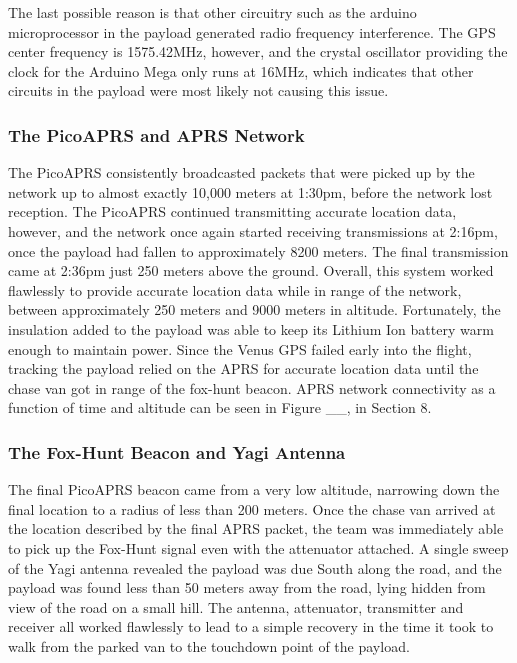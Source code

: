\documentclass[12pt,]{article}
\begin{document}
The last possible reason is that other circuitry such as the arduino
microprocessor in the payload generated radio frequency interference.
The GPS center frequency is 1575.42MHz, however, and the crystal
oscillator providing the clock for the Arduino Mega only runs at 16MHz,
which indicates that other circuits in the payload were most likely not
causing this issue.

\subsubsection{The PicoAPRS and APRS
Network}\label{the-picoaprs-and-aprs-network}

The PicoAPRS consistently broadcasted packets that were picked up by the
network up to almost exactly 10,000 meters at 1:30pm, before the network
lost reception. The PicoAPRS continued transmitting accurate location
data, however, and the network once again started receiving
transmissions at 2:16pm, once the payload had fallen to approximately
8200 meters. The final transmission came at 2:36pm just 250 meters above
the ground. Overall, this system worked flawlessly to provide accurate
location data while in range of the network, between approximately 250
meters and 9000 meters in altitude. Fortunately, the insulation added to
the payload was able to keep its Lithium Ion battery warm enough to
maintain power. Since the Venus GPS failed early into the flight,
tracking the payload relied on the APRS for accurate location data until
the chase van got in range of the fox-hunt beacon. APRS network
connectivity as a function of time and altitude can be seen in Figure
\_\_, in Section 8.

\subsubsection{The Fox-Hunt Beacon and Yagi
Antenna}\label{the-fox-hunt-beacon-and-yagi-antenna}

The final PicoAPRS beacon came from a very low altitude, narrowing down
the final location to a radius of less than 200 meters. Once the chase
van arrived at the location described by the final APRS packet, the team
was immediately able to pick up the Fox-Hunt signal even with the
attenuator attached. A single sweep of the Yagi antenna revealed the
payload was due South along the road, and the payload was found less
than 50 meters away from the road, lying hidden from view of the road on
a small hill. The antenna, attenuator, transmitter and receiver all
worked flawlessly to lead to a simple recovery in the time it took to
walk from the parked van to the touchdown point of the payload.
\end{document}
